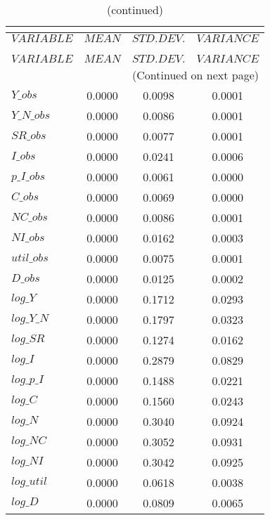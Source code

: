  
\begin{center}
\begin{longtable}{lccc} 
\caption{THEORETICAL MOMENTS}\\
 \label{Table:th_moments}\\
\toprule 
$VARIABLE   $	 & 	 $         MEAN$	 & 	 $    STD. DEV.$	 & 	 $     VARIANCE$\\
\midrule \endfirsthead 
\caption{(continued)}\\
 \toprule \\ 
$VARIABLE   $	 & 	 $         MEAN$	 & 	 $    STD. DEV.$	 & 	 $     VARIANCE$\\
\midrule \endhead 
\midrule \multicolumn{4}{r}{(Continued on next page)} \\ \bottomrule \endfoot 
\bottomrule \endlastfoot 
$Y\_obs     $	 & 	       0.0000	 & 	       0.0098	 & 	       0.0001 \\ 
$Y\_N\_obs  $	 & 	       0.0000	 & 	       0.0086	 & 	       0.0001 \\ 
$SR\_obs    $	 & 	       0.0000	 & 	       0.0077	 & 	       0.0001 \\ 
$I\_obs     $	 & 	       0.0000	 & 	       0.0241	 & 	       0.0006 \\ 
$p\_I\_obs  $	 & 	       0.0000	 & 	       0.0061	 & 	       0.0000 \\ 
$C\_obs     $	 & 	       0.0000	 & 	       0.0069	 & 	       0.0000 \\ 
$NC\_obs    $	 & 	       0.0000	 & 	       0.0086	 & 	       0.0001 \\ 
$NI\_obs    $	 & 	       0.0000	 & 	       0.0162	 & 	       0.0003 \\ 
$util\_obs  $	 & 	       0.0000	 & 	       0.0075	 & 	       0.0001 \\ 
$D\_obs     $	 & 	       0.0000	 & 	       0.0125	 & 	       0.0002 \\ 
$log\_Y     $	 & 	       0.0000	 & 	       0.1712	 & 	       0.0293 \\ 
$log\_Y\_N  $	 & 	       0.0000	 & 	       0.1797	 & 	       0.0323 \\ 
$log\_SR    $	 & 	       0.0000	 & 	       0.1274	 & 	       0.0162 \\ 
$log\_I     $	 & 	       0.0000	 & 	       0.2879	 & 	       0.0829 \\ 
$log\_p\_I  $	 & 	       0.0000	 & 	       0.1488	 & 	       0.0221 \\ 
$log\_C     $	 & 	       0.0000	 & 	       0.1560	 & 	       0.0243 \\ 
$log\_N     $	 & 	       0.0000	 & 	       0.3040	 & 	       0.0924 \\ 
$log\_NC    $	 & 	       0.0000	 & 	       0.3052	 & 	       0.0931 \\ 
$log\_NI    $	 & 	       0.0000	 & 	       0.3042	 & 	       0.0925 \\ 
$log\_util  $	 & 	       0.0000	 & 	       0.0618	 & 	       0.0038 \\ 
$log\_D     $	 & 	       0.0000	 & 	       0.0809	 & 	       0.0065 \\ 
\end{longtable}
 \end{center}
